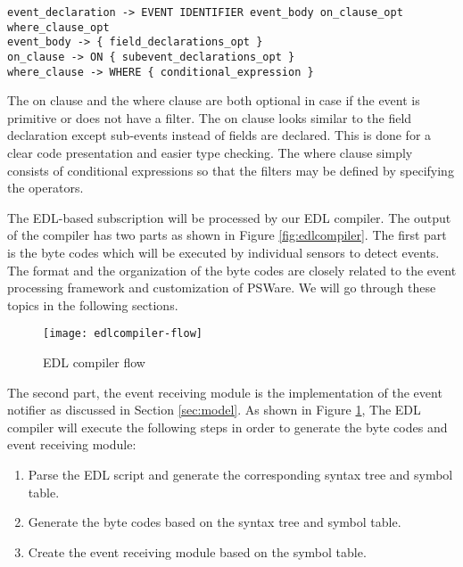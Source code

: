 \begin{lstlisting}[caption=BNF (simplified) of event type, label=lst:BNFEvent]
event_declaration -> EVENT IDENTIFIER event_body on_clause_opt where_clause_opt
event_body -> { field_declarations_opt }
on_clause -> ON { subevent_declarations_opt }
where_clause -> WHERE { conditional_expression }
\end{lstlisting}

The on clause and the where clause are both optional in case if the event is primitive or does not have a filter. The on clause looks similar to the field declaration except sub-events instead of fields are declared. This is done for a clear code presentation and easier type checking. The where clause simply consists of conditional expressions so that the filters may be defined by specifying the operators.

\begin{comment}
A simple example of using EDL is shown in Listing \ref{lst:originaledl}. In this example, two events, 'SimpleEvent' and 'CompEvent' are defined. 'SimpleEvent' is a primitive event which occurs when the detected temperature reading is above certain threshold. 'CompEvent' is a composite event that is based on two events of 'SimpleEvent' and their time must satisfy a certain condition in order to indicate the occurrence of 'CompEvent'.
\begin{lstlisting}[caption=A simple EDL program, label=lst:originaledl]
Event SimpleEvent {
	int temp=System.temp;
	int id=System.id;
	int time=System.time;
} where {
	temp > 30
}
Event CompEvent {
} on {
	SimpleEvent e1 and
	SimpleEvent e2
} where {
	e2.time-e1.time=600
}
\end{lstlisting}
\end{comment}

The EDL-based subscription will be processed by our EDL compiler. The output of the compiler has two parts as shown in Figure \ref{fig:edlcompiler}. The first part is the byte codes which will be executed by individual sensors to detect events. The format and the organization of the byte codes are closely related to the event processing framework and customization of PSWare. We will go through these topics in the following sections.

\begin{figure}
\centering
\texttt{[image: edlcompiler-flow]}
\caption{EDL compiler flow}
\label{fig:edlcompiler-flow}
\end{figure}

The second part, the event receiving module is the implementation of the event notifier as discussed in Section \ref{sec:model}. As shown in Figure \ref{fig:edlcompiler-flow}, The EDL compiler will execute the following steps in order to generate the byte codes and event receiving module:
\begin{enumerate}
\item Parse the EDL script and generate the corresponding syntax tree and symbol table.
\item Generate the byte codes based on the syntax tree and symbol table.
\item Create the event receiving module based on the symbol table.
\end{enumerate}

